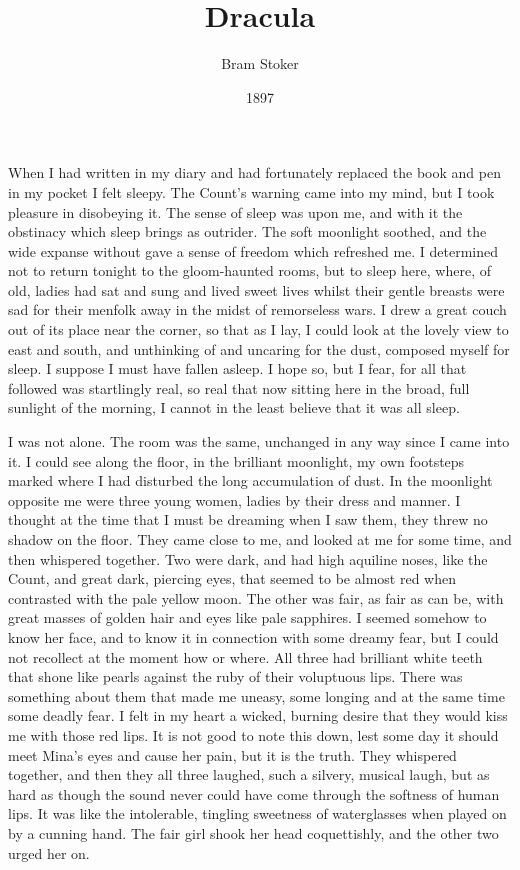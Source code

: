 \documentclass[10pt,a4paper]{article}
\begin{document}
\title{Dracula}
\date{1897}
\author{Bram Stoker}
\maketitle
    
\thispagestyle{plain}
\setcounter{page}{1}
\linenumbers
When I had written in my diary and had fortunately replaced the book and pen in my pocket I felt sleepy. The Count's warning came into my mind, but I took pleasure in disobeying it. The sense of sleep was upon me, and with it the obstinacy which sleep brings as outrider. The soft moonlight soothed, and the wide expanse without gave a sense of freedom which refreshed me. I determined not to return tonight to the gloom-haunted rooms, but to sleep here, where, of old, ladies had sat and sung and lived sweet lives whilst their gentle breasts were sad for their menfolk away in the midst of remorseless wars. I drew a great couch out of its place near the corner, so that as I lay, I could look at the lovely view to east and south, and unthinking of and uncaring for the dust, composed myself for sleep. I suppose I must have fallen asleep. I hope so, but I fear, for all that followed was startlingly real, so real that now sitting here in the broad, full sunlight of the morning, I cannot in the least believe that it was all sleep.

I was not alone. The room was the same, unchanged in any way since I came into it. I could see along the floor, in the brilliant moonlight, my own footsteps marked where I had disturbed the long accumulation of dust. In the moonlight opposite me were three young women, ladies by their dress and manner. I thought at the time that I must be dreaming when I saw them, they threw no shadow on the floor. They came close to me, and looked at me for some time, and then whispered together. Two were dark, and had high aquiline noses, like the Count, and great dark, piercing eyes, that seemed to be almost red when contrasted with the pale yellow moon. The other was fair, as fair as can be, with great masses of golden hair and eyes like pale sapphires. I seemed somehow to know her face, and to know it in connection with some dreamy fear, but I could not recollect at the moment how or where. All three had brilliant white teeth that shone like pearls against the ruby of their voluptuous lips. There was something about them that made me uneasy, some longing and at the same time some deadly fear. I felt in my heart a wicked, burning desire that they would kiss me with those red lips. It is not good to note this down, lest some day it should meet Mina's eyes and cause her pain, but it is the truth. They whispered together, and then they all three laughed, such a silvery, musical laugh, but as hard as though the sound never could have come through the softness of human lips. It was like the intolerable, tingling sweetness of waterglasses when played on by a cunning hand. The fair girl shook her head coquettishly, and the other two urged her on.
\end{document}
